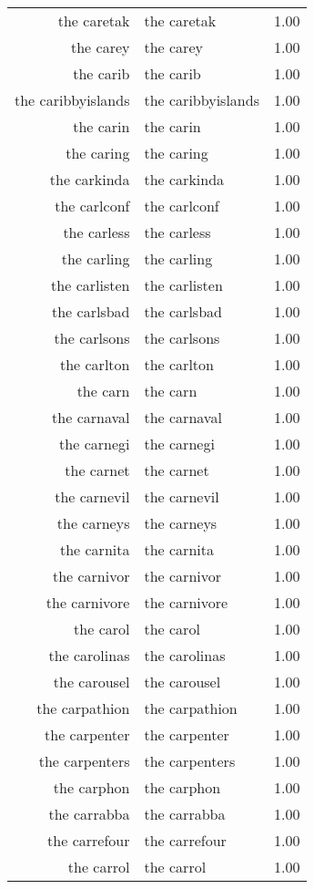 \begin{table}[ht]
\begin{tabular}{rlr}
  the caretak & the caretak & 1.00 \\ 
  the carey & the carey & 1.00 \\ 
  the carib & the carib & 1.00 \\ 
  the caribbyislands & the caribbyislands & 1.00 \\ 
  the carin & the carin & 1.00 \\ 
  the caring & the caring & 1.00 \\ 
  the carkinda & the carkinda & 1.00 \\ 
  the carlconf & the carlconf & 1.00 \\ 
  the carless & the carless & 1.00 \\ 
  the carling & the carling & 1.00 \\ 
  the carlisten & the carlisten & 1.00 \\ 
  the carlsbad & the carlsbad & 1.00 \\ 
  the carlsons & the carlsons & 1.00 \\ 
  the carlton & the carlton & 1.00 \\ 
  the carn & the carn & 1.00 \\ 
  the carnaval & the carnaval & 1.00 \\ 
  the carnegi & the carnegi & 1.00 \\ 
  the carnet & the carnet & 1.00 \\ 
  the carnevil & the carnevil & 1.00 \\ 
  the carneys & the carneys & 1.00 \\ 
  the carnita & the carnita & 1.00 \\ 
  the carnivor & the carnivor & 1.00 \\ 
  the carnivore & the carnivore & 1.00 \\ 
  the carol & the carol & 1.00 \\ 
  the carolinas & the carolinas & 1.00 \\ 
  the carousel & the carousel & 1.00 \\ 
  the carpathion & the carpathion & 1.00 \\ 
  the carpenter & the carpenter & 1.00 \\ 
  the carpenters & the carpenters & 1.00 \\ 
  the carphon & the carphon & 1.00 \\ 
  the carrabba & the carrabba & 1.00 \\ 
  the carrefour & the carrefour & 1.00 \\ 
  the carrol & the carrol & 1.00 \\ 

\end{tabular}
\end{table}
